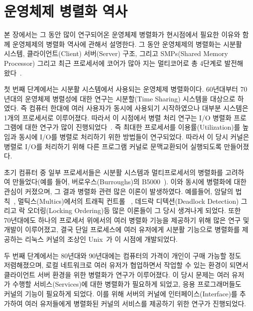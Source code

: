 \section{운영체제 병렬화 역사}
본 장에서는 그 동안 많이 연구되어온 운영체제 병렬화가 현시점에서 필요한 이유와 함께 
운영체제의 병렬화 역사에 관해서 설명한다.
그 동안 운영체제의 병렬화는 시분활 시스템, 클라이언트(Client) 서버(Server) 구조, 그리고 SMPs(Shared Memory
Processor) 그리고 최근 프로세서에 코어가 많아 지는 멀티코어로 총 4단계로 발전해 왔다~\cite{Kaashoek2015PCO}.

첫 번째 단계에서는 시분활 시스템에서 사용되는 운영체제 병렬화이다. 
60년대부터 70년대의 운영체제 병렬성에 대한 연구는 시분할(Time Sharing) 시스템을 대상으로 하였다.
즉 컴퓨터 한대에 여러 사용자가 동시에 사용되기 시작하였으나 대부분 시스템은 1개의 프로세서로 이루어졌다.
따라서 이 시점에서 병렬 처리 연구는 I/O 병렬화 프로그램에 대한 연구가 많이 진행되었다~\cite{Bloch1959EDS}.
즉 최대한 프로세서를 이용률(Utilization)를 높임과 동시에 I/O를 병렬로 처리하기 위한 방법들이 연구되었다.
따라서 이 당시 커널은 병렬로 I/O를 처리하기 위해 다른 프로그램 커널로 문맥교환되어 실행되도록 만들어졌다.
 
초기 컴퓨터 중 일부 프로세서들은 시분활 시스템과 멀티프로세서의 병렬화를 고려하여 
만들었다(예를 들어, 버로우스(Burroughs)의 B5000~\cite{Mayer1982ABB}).
이와 동시에 병렬화에 대한 관심이 커졌으며, 
그 결과 병렬화 관련 많은 이론이 발생하였다. 
예를들어, 암달의 법칙~\cite{Amdahl1967VSP}, 멀틱스(Multics)에서의 트래픽 컨트롤
~\cite{Saltzer1966TCM}, 데드락 디텍션(Deadlock Detection) 그리고 락 오더링(Locking
Ordering)등 많은 이론들이 그 당시 생겨나게 되었다. 
또한 70년대에도 하나의 프로세서 위에서의 여러 병렬화 기능을 제공하기 위해 많은 연구 및 개발이 이루어졌고, 
결국 단일 프로세스에 여러 유저에게 시분활 기능으로 병렬화를 제공하는 리눅스 커널의 
조상인 Unix~\cite{Ritchie1973UTS}가 이 시점에 개발되었다.

두 번째 단계에서는 80년대와 90년대에는 컴퓨터의 가격이 개인이 구매 가능할 정도 저렴해졌으며,
로컬 네트워크로 여러 유저가 협업하면서 작업할 수 있는 환경이 되면서 클라이언트 서버 환경을 위한 
병렬화가 연구가 이루어졌다.
이 당시 문제는 여러 유저가 수행할 서비스(Services)에 대한 병렬화가 필요하게 되었고, 
응용 프로그래머들도 커널의 기능이 필요하게 되었다.
이를 위해 서버의 커널에 인터페이스(Interface)를 추가하여 여러 유저들에게 병렬화된 
커널의 서비스를 제공하기 위한 연구가 진행되었다.
 
